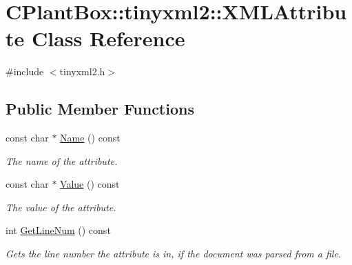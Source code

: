 \hypertarget{classCPlantBox_1_1tinyxml2_1_1XMLAttribute}{}\section{C\+Plant\+Box\+:\+:tinyxml2\+:\+:X\+M\+L\+Attribute Class Reference}
\label{classCPlantBox_1_1tinyxml2_1_1XMLAttribute}


{\ttfamily \#include $<$tinyxml2.\+h$>$}

\subsection*{Public Member Functions}
\begin{DoxyCompactItemize}
\item 
\mbox{\label{classCPlantBox_1_1tinyxml2_1_1XMLAttribute_abd55bb2e54fcd4d7fb626e25a11b73ae}} 
const char $\ast$ \hyperlink{classCPlantBox_1_1tinyxml2_1_1XMLAttribute_abd55bb2e54fcd4d7fb626e25a11b73ae}{Name} () const
\begin{DoxyCompactList}\small\item\em The name of the attribute. \end{DoxyCompactList}\item 
\mbox{\label{classCPlantBox_1_1tinyxml2_1_1XMLAttribute_a4024a2f2fc69e4533f8418505029fde4}} 
const char $\ast$ \hyperlink{classCPlantBox_1_1tinyxml2_1_1XMLAttribute_a4024a2f2fc69e4533f8418505029fde4}{Value} () const
\begin{DoxyCompactList}\small\item\em The value of the attribute. \end{DoxyCompactList}\item 
\mbox{\label{classCPlantBox_1_1tinyxml2_1_1XMLAttribute_a986a3f86ab0a2e7b818339be4607c9be}} 
int \hyperlink{classCPlantBox_1_1tinyxml2_1_1XMLAttribute_a986a3f86ab0a2e7b818339be4607c9be}{Get\+Line\+Num} () const
\begin{DoxyCompactList}\small\item\em Gets the line number the attribute is in, if the document was parsed from a file. \end{DoxyCompactList}\item 

\end{DoxyCompactItemize}
